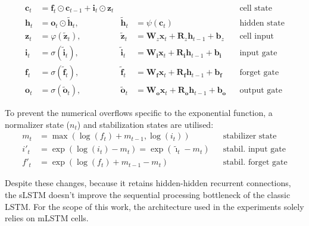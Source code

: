 \begin{align}
    \mathbf{c}_t &= \mathbf{f}_t \odot \mathbf{c}_{t-1} + \mathbf{i}_t \odot \mathbf{z}_t && && \text{cell state} \\
    \mathbf{h}_t &= \mathbf{o}_t \odot \tilde{\mathbf{h}}_t, & \tilde{\mathbf{h}}_t &= \psi(\mathbf{c}_t) && \text{hidden state} \\
    \mathbf{z}_t &= \varphi(\tilde{\mathbf{z}}_t), & \tilde{\mathbf{z}}_t &= \boldsymbol{W}_z \boldsymbol{x}_t + \boldsymbol{R}_z \boldsymbol{h}_{t-1} + \boldsymbol{b}_z && \text{cell input} \\
    \mathbf{i}_t &= \sigma(\tilde{\mathbf{i}}_t), & \tilde{\mathbf{i}}_t &= \boldsymbol{W}_{\mathbf{i}} \boldsymbol{x}_t + \boldsymbol{R}_{\mathbf{i}} \boldsymbol{h}_{t-1} + \boldsymbol{b}_{\mathbf{i}} && \text{input gate} \\
    \mathbf{f}_t &= \sigma(\tilde{\mathbf{f}}_t), & \tilde{\mathbf{f}}_t &= \boldsymbol{W}_{\mathbf{f}} \boldsymbol{x}_t + \boldsymbol{R}_{\mathbf{f}} \boldsymbol{h}_{t-1} + \boldsymbol{b}_{\mathbf{f}} && \text{forget gate} \\
    \mathbf{o}_t &= \sigma(\tilde{\mathbf{o}}_t), & \tilde{\mathbf{o}}_t &= \boldsymbol{W}_{\mathbf{o}} \boldsymbol{x}_t + \boldsymbol{R}_{\mathbf{o}} \boldsymbol{h}_{t-1} + \boldsymbol{b}_{\mathbf{o}} && \text{output gate}
\end{align}

\noindent To prevent the numerical overflows specific to the exponential function, a normalizer 
state ($n_t$) and stabilization states are utilised:
\begin{align}
    m_t &= \max \left( \log(f_t) + m_{t-1}, \log(i_t) \right) && \text{stabilizer state} \label{eq:stabilizer-state}\\
    i'_t &= \exp \left( \log(i_t) - m_t \right) = \exp(\tilde{\imath}_t - m_t) && \text{stabil. input gate} \\
    f'_t &= \exp \left( \log(f_t) + m_{t-1} - m_t \right) && \text{stabil. forget gate}
\end{align}

\noindent Despite these changes, because it retains hidden-hidden recurrent connections, 
the sLSTM doesn't improve the sequential processing bottleneck of the classic LSTM.
For the scope of this work, the architecture used in the experiments solely relies on mLSTM cells. 

